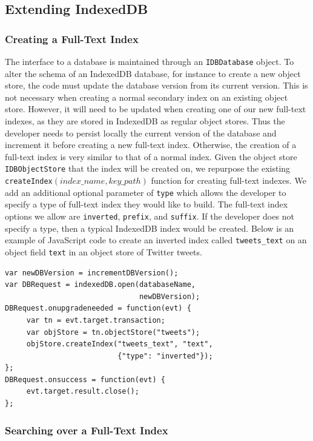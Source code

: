 \documentclass{vldb}
\begin{document}
\subsection{Extending IndexedDB}

\subsubsection{Creating a Full-Text Index}
The interface to a database is maintained through an \texttt{IDBDatabase} object.
To alter the schema of an IndexedDB database, for instance to create a new object store, the code must update the database version from its current version. This is not necessary when creating a normal secondary index on an existing object store. However, it will need to be updated when creating one of our new full-text indexes, as they are stored in IndexedDB as regular object stores. Thus the developer needs to persist locally the current version of the database and increment it before creating a new full-text index. Otherwise, the creation of a full-text index is very similar to that of a normal index. Given the object store \texttt{IDBObjectStore} that the index will be created on, we repurpose the existing \texttt{createIndex$\left(index\_name, key\_path\right)$} function for creating full-text indexes. We add an additional optional parameter of \texttt{type} which allows the developer to specify a type of full-text index they would like to build. The full-text index options we allow are \texttt{inverted}, \texttt{prefix}, and \texttt{suffix}. If the developer does not specify a type, then a typical IndexedDB index would be created. Below is an example of JavaScript code to create an inverted index called \texttt{tweets\_text} on an object field \texttt{text} in an object store of Twitter tweets.

\begin{verbatim}
var newDBVersion = incrementDBVersion();
var DBRequest = indexedDB.open(databaseName,
                               newDBVersion);
DBRequest.onupgradeneeded = function(evt) {
     var tn = evt.target.transaction;	
     var objStore = tn.objectStore("tweets");
     objStore.createIndex("tweets_text", "text", 
                          {"type": "inverted"});
};
DBRequest.onsuccess = function(evt) {
     evt.target.result.close();
};
\end{verbatim}


\subsubsection{Searching over a Full-Text Index}
\end{document}
